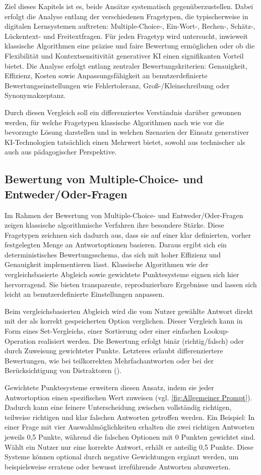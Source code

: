 \documentclass[a4paper,12pt]{article}
\begin{document}
Ziel dieses Kapitels ist es, beide Ansätze systematisch gegenüberzustellen. Dabei erfolgt die Analyse entlang der verschiedenen Fragetypen, die typischerweise in digitalen Lernsystemen auftreten: Multiple-Choice-, Ein-Wort-, Rechen-, Schätz-, Lückentext- und Freitextfragen. Für jeden Fragetyp wird untersucht, inwieweit klassische Algorithmen eine präzise und faire Bewertung ermöglichen oder ob die Flexibilität und Kontextsensitivität generativer KI einen signifikanten Vorteil bietet. Die Analyse erfolgt entlang zentraler Bewertungskriterien: Genauigkeit, Effizienz, Kosten sowie Anpassungsfähigkeit an benutzerdefinierte Bewertungseinstellungen wie Fehlertoleranz, Groß-/Kleinschreibung oder Synonymakzeptanz.

Durch diesen Vergleich soll ein differenziertes Verständnis darüber gewonnen werden, für welche Fragetypen klassische Algorithmen nach wie vor die bevorzugte Lösung darstellen und in welchen Szenarien der Einsatz generativer KI-Technologien tatsächlich einen Mehrwert bietet, sowohl aus technischer als auch aus pädagogischer Perspektive.

\subsection{Bewertung von Multiple-Choice- und Entweder/Oder-Fragen}
Im Rahmen der Bewertung von Multiple-Choice- und Entweder/Oder-Fragen zeigen klassische algorithmische Verfahren ihre besondere Stärke. Diese Fragetypen zeichnen sich dadurch aus, dass sie auf einer klar definierten, vorher festgelegten Menge an Antwortoptionen basieren. Daraus ergibt sich ein deterministisches Bewertungsschema, das sich mit hoher Effizienz und Genauigkeit implementieren lässt. Klassische Algorithmen wie der vergleichsbasierte Abgleich sowie gewichtete Punktesysteme eignen sich hier hervorragend. Sie bieten transparente, reproduzierbare Ergebnisse und lassen sich leicht an benutzerdefinierte Einstellungen anpassen.

Beim vergleichsbasierten Abgleich wird die vom Nutzer gewählte Antwort direkt mit der als korrekt gespeicherten Option verglichen. Dieser Vergleich kann in Form eines Set-Vergleichs, einer Sortierung oder einer einfachen Lookup-Operation realisiert werden. Die Bewertung erfolgt binär (richtig/falsch) oder durch Zuweisung gewichteter Punkte. Letzteres erlaubt differenziertere Bewertungen, wie bei teilkorrekten Mehrfachantworten oder bei der Berücksichtigung von Distraktoren (\cite{RoedigerMarsh2005}).

Gewichtete Punktesysteme erweitern diesen Ansatz, indem sie jeder Antwortoption einen spezifischen Wert zuweisen (vgl. \ref{fig:Allgemeiner Prompt}). Dadurch kann eine feinere Unterscheidung zwischen vollständig richtigen, teilweise richtigen und klar falschen Antworten getroffen werden. Ein Beispiel: In einer Frage mit vier Auswahlmöglichkeiten erhalten die zwei richtigen Antworten jeweils 0,5 Punkte, während die falschen Optionen mit 0 Punkten gewichtet sind. Wählt ein Nutzer nur eine korrekte Antwort, erhält er anteilig 0,5 Punkte. Diese Systeme können optional durch negative Gewichtungen ergänzt werden, um beispielsweise erratene oder bewusst irreführende Antworten abzuwerten.
\end{document}
